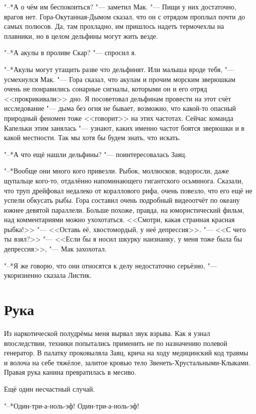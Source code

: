 "--*А о чём им беспокоиться? "--- заметил Мак.
"--- Пищи у них достаточно, врагов нет.
Гора-Окутанная-Дымом сказал, что он с отрядом проплыл почти до самых полюсов.
Да, там прохладно, им пришлось надеть термочехлы на плавники, но в целом дельфины могут жить везде.

"--*А акулы в проливе Скар? "--- спросил я.

"--*Акулы могут утащить разве что дельфинят.
Или малыша вроде тебя, "--- усмехнулся Мак.
"--- Гора сказал, что акулам и прочим морским зверюшкам очень не понравились сонарные сигналы, которыми он и его отряд <<прокрикивали>> дно.
Я посоветовал дельфинам провести на этот счёт исследование "--- дыма без огня не бывает, возможно, что какой-то опасный природный феномен тоже <<говорит>> на этих частотах.
Сейчас команда Капельки этим занялась "--- узнают, каких именно частот боятся зверюшки и в какой местности.
Так мы хотя бы будем знать, что искать.

"--*А что ещё нашли дельфины? "--- поинтересовалась Заяц.

"--*Вообще они много кого привезли.
Рыбок, моллюсков, водоросли, даже щупальце кого-то, отдалённо напоминающего гигантского осьминога.
Сказали, что труп дрейфовал недалеко от кораллового рифа, очень повезло, что его ещё не успели обкусать рыбы.
Гора составил очень подробный видеоотчёт по океану южнее девятой параллели.
Больше похоже, правда, на юмористический фильм, над комментариями можно ухохотаться.
<<Смотри, какая странная красная рыбка!>>
"--- <<Оставь её, хвостомордый, у неё депрессия>>.
"--- <<С чего ты взял?>>
"--- <<Если бы я носил шкурку наизнанку, у меня тоже была бы депрессия>>, "--- Мак захохотал.

"--*Я же говорю, что они относятся к делу недостаточно серьёзно, "--- укоризненно сказала Листик.

\section{Рука}

Из наркотической полудрёмы меня вырвал звук взрыва.
Как я узнал впоследствии, техники попытались применить не по назначению полевой генератор.
В палатку проковыляла Заяц, крича на ходу медицинский код травмы и волоча на себе тяжёлое, залитое кровью тело Звенеть-Хрустальными-Клыками.
Правая рука канина превратилась в месиво.

Ещё один несчастный случай.

"--*Один-три-а-ноль-эф!
Один-три-а-ноль-эф!

